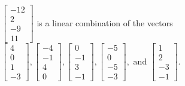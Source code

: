 \begin{exercise}
\begin{exerciseStatement}
  \end{exerciseStatement}
  \begin{exerciseAnswer}
   \(\left[\begin{array}{c}
-12 \\
2 \\
-9 \\
11
\end{array}\right]\) 
  	 is  
	a linear combination of the vectors \(\left[\begin{array}{c}
4 \\
0 \\
1 \\
-3
\end{array}\right] , \left[\begin{array}{c}
-4 \\
-1 \\
4 \\
0
\end{array}\right] , \left[\begin{array}{c}
0 \\
-1 \\
3 \\
-1
\end{array}\right] , \left[\begin{array}{c}
-5 \\
0 \\
-5 \\
-3
\end{array}\right] , \text{ and } \left[\begin{array}{c}
1 \\
2 \\
-3 \\
-1
\end{array}\right]\).

	
  


  \end{exerciseAnswer}
\end{exercise}